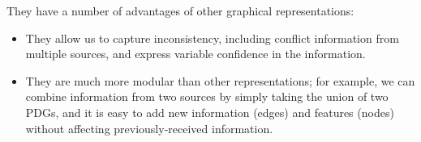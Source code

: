 \documentclass[letterpaper]{article} %
\theoremstyle{plain}
\theoremstyle{definition}
\theoremstyle{remark}
\begin{document}
They have a number of advantages of other
graphical representations:
\begin{itemize}
  \item They allow us to capture inconsistency,
including conflict information from multiple sources, and
express variable confidence in the information. 
\item 
They are much more
modular 
than other representations; 
for example, we can
combine information from two sources by simply taking the union of two
PDGs, and it is easy to add new information 
(edges)
and features (nodes)
without affecting previously-received information.

\end{itemize}
\end{document}
